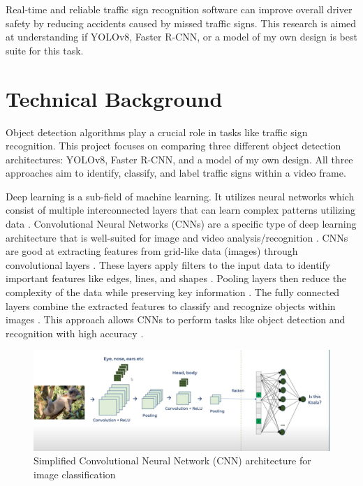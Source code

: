 \documentclass[10pt,twocolumn]{article}
\begin{document}
Real-time and reliable traffic sign recognition software can improve overall driver safety by reducing accidents caused by missed traffic signs. This research is aimed at understanding if YOLOv8, Faster R-CNN, or a model of my own design is best suite for this task.  

\section{Technical Background}
Object detection algorithms play a crucial role in tasks like traffic sign recognition. This project focuses on comparing three different object detection architectures: YOLOv8, Faster R-CNN, and a model of my own design. All three approaches aim to identify, classify, and label traffic signs within a video frame.

Deep learning is a sub-field of machine learning. It utilizes neural networks which consist of multiple interconnected layers that can learn complex patterns utilizing data \textcite{intel}. Convolutional Neural Networks (CNNs) are a specific type of deep learning architecture that is well-suited for image and video analysis/recognition \textcite{intel}. CNNs are good at extracting features from grid-like data (images) through convolutional layers \textcite{intel}. These layers apply filters to the input data to identify important features like edges, lines, and shapes \textcite{intel}. Pooling layers then reduce the complexity of the data while preserving key information \textcite{intel}. The fully connected layers combine the extracted features to classify and recognize objects within images \textcite{intel}. This approach allows CNNs to perform tasks like object detection and recognition with high accuracy \textcite{intel}. 

\begin{figure}[h]
    \centering
    \includegraphics[width=.95\linewidth]{CNN.png}    \caption{
        Simplified Convolutional Neural Network (CNN) architecture for image classification \textcite{LI}
    }
    \label{fig:first-page}
\end{figure}
\end{document}
